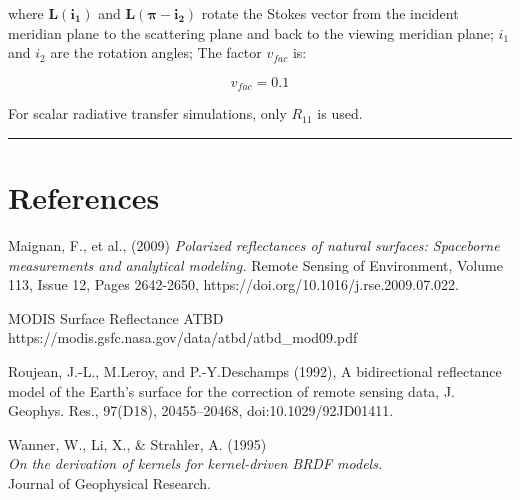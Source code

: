 \documentclass[
  letterpaper,
  open=any]{scrbook}
\begin{document}
where \(\mathbf{L(i_1)}\) and \(\mathbf{L(\pi-i_2)}\) rotate the Stokes
vector from the incident meridian plane to the scattering plane and back
to the viewing meridian plane; \(i_1\) and \(i_2\) are the rotation
angles; The factor \(v_{fac}\) is:

\[
v_{fac} = 0.1
\]

For scalar radiative transfer simulations, only \(R_{11}\) is used.

\begin{center}\rule{0.5\linewidth}{0.5pt}\end{center}

\section{References}\label{references}

Maignan, F., et al., (2009) \emph{Polarized reflectances of natural
surfaces: Spaceborne measurements and analytical modeling.} Remote
Sensing of Environment, Volume 113, Issue 12, Pages 2642-2650,
https://doi.org/10.1016/j.rse.2009.07.022.

MODIS Surface Reflectance ATBD\\
https://modis.gsfc.nasa.gov/data/atbd/atbd\_mod09.pdf

Roujean, J.-L., M.Leroy, and P.-Y.Deschamps (1992), A bidirectional
reflectance model of the Earth's surface for the correction of remote
sensing data, J. Geophys. Res., 97(D18), 20455--20468,
doi:10.1029/92JD01411.

Wanner, W., Li, X., \& Strahler, A. (1995)\\
\emph{On the derivation of kernels for kernel-driven BRDF models.}\\
Journal of Geophysical Research.
\end{document}
